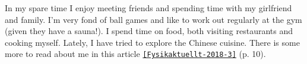


\begin{cvparagraph}
In my spare time I enjoy meeting friends and spending time with my girlfriend and family.
I'm very fond of ball games and like to work out regularly at the gym (given they have a sauna!). %
I spend time on food, both visiting restaurants and cooking myself. 
Lately, I have tried to explore the Chinese cuisine.
There is some more to read about me in this article \href{http://www.fysikersamfundet.se/wp-content/uploads/Fysikaktuellt3-18_Webb.pdf}{\texttt{[Fysikaktuellt-2018-3]}} (p. 10).
\end{cvparagraph}
